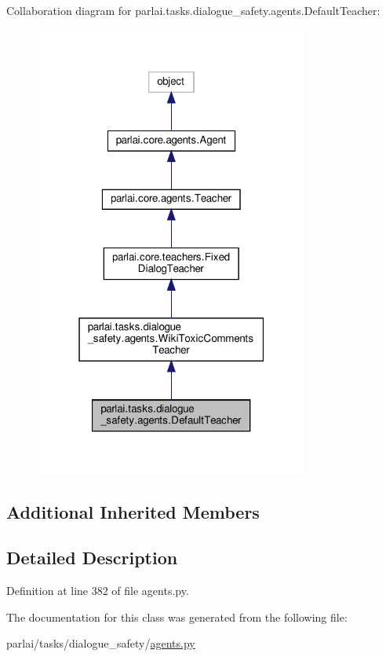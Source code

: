 Collaboration diagram for parlai.\+tasks.\+dialogue\+\_\+safety.\+agents.\+Default\+Teacher\+:
\nopagebreak
\begin{figure}[H]
\begin{center}
\leavevmode
\includegraphics[width=256pt]{d3/d28/classparlai_1_1tasks_1_1dialogue__safety_1_1agents_1_1DefaultTeacher__coll__graph}
\end{center}
\end{figure}
\subsection*{Additional Inherited Members}


\subsection{Detailed Description}


Definition at line 382 of file agents.\+py.



The documentation for this class was generated from the following file\+:\begin{DoxyCompactItemize}
\item 
parlai/tasks/dialogue\+\_\+safety/\hyperlink{parlai_2tasks_2dialogue__safety_2agents_8py}{agents.\+py}\end{DoxyCompactItemize}
